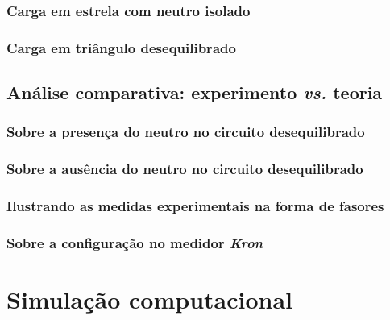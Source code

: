 \documentclass[a4paper,12pt,oneside,openany,table,xcdraw]{article}
\begin{document}
\subsubsection{Carga em estrela com neutro isolado} \label{m2:teoria}

\subsubsection{Carga em triângulo desequilibrado} \label{m3:teoria}

\subsection{Análise comparativa: experimento \emph{vs.} teoria}
\subsubsection{Sobre a presença do neutro no circuito desequilibrado}

\subsubsection{Sobre a ausência do neutro no circuito desequilibrado}


\subsubsection{Ilustrando as medidas experimentais na forma de fasores}

\subsubsection{Sobre a configuração no medidor \emph{Kron}}



\newpage
\section{Simulação computacional} %
\end{document}
